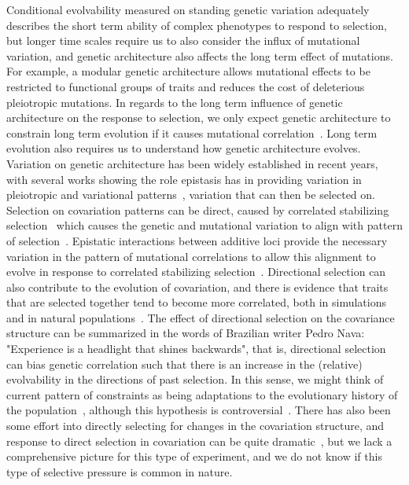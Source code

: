 \begin{refsection}
Conditional evolvability measured on standing genetic variation adequately
describes the short term ability of complex phenotypes to respond to
selection, but longer time scales require us to also consider the influx of
mutational variation, and genetic architecture also affects the long term
effect of mutations. For example, a modular genetic architecture allows
mutational effects to be restricted to functional groups of traits and reduces
the cost of deleterious pleiotropic mutations. In regards to the long term
influence of genetic architecture on the response to selection, we only expect
genetic architecture to constrain long term evolution if it causes mutational
correlation~\parencite{Chebib2017-sv}. Long term evolution also requires us to
understand how genetic architecture evolves. Variation on genetic architecture
has been widely established in recent years, with several works showing the
role epistasis has in providing variation in pleiotropic and variational
patterns~\parencite{Pavlicev2015-up, Cheverud1996-fm, Cheverud2004-qr,
Wolf2006-xt, Pavlicev2008-jy}, variation that can then be selected on.
Selection on covariation patterns can be direct, caused by correlated
stabilizing selection~\parencite{Burger1994-nv} which causes the genetic and
mutational variation to align with pattern of
selection~\parencite{Cheverud1984-mi}. Epistatic interactions between additive
loci provide the necessary variation in the pattern of mutational correlations
to allow this alignment to evolve in response to correlated stabilizing
selection~\parencite{Jones2014-wj}. Directional selection can also contribute
to the evolution of covariation, and there is evidence that traits that are
selected together tend to become more correlated, both in
simulations~\parencite{Pavlicev2011-wz, Melo2015-bk, Jones2004-be,
Watson2014-pi} and in natural populations~\parencite{Penna2017-if,
Assis2016-vz, Roff2012-fe}. The effect of directional selection on the
covariance structure can be summarized in the words of Brazilian writer Pedro
Nava: "Experience is a headlight that shines backwards", that is, directional
selection can bias genetic correlation such that there is an increase in the
(relative) evolvability in the directions of past selection. In this sense, we
might think of current pattern of constraints as being adaptations to the
evolutionary history of the population~\parencite{Draghi2008-cv}, although
this hypothesis is controversial~\parencite{Lynch2007-kz, Lynch2007-ch}. There
has also been some effort into directly selecting for changes in the
covariation structure, and response to direct selection in covariation can be
quite dramatic~\parencite{Delph2011-bc}, but we lack a comprehensive picture
for this type of experiment, and we do not know if this type of selective
pressure is common in nature.


\end{refsection}
